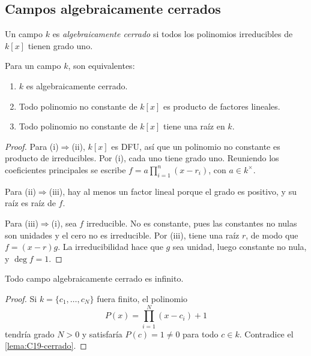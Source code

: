 \subsection{Campos algebraicamente cerrados}
\begin{defi}
Un campo $k$ es \emph{algebraicamente cerrado} si todos los polinomios irreducibles de $k[x]$ tienen grado uno.
\end{defi}
\begin{lema}\label{lema:C19-cerrado}
Para un campo $k$, son equivalentes:
\begin{enumerate}[label=\textup{(\roman*)}]
\item $k$ es algebraicamente cerrado.
\item Todo polinomio no constante de $k[x]$ es producto de factores lineales.
\item Todo polinomio no constante de $k[x]$ tiene una raíz en $k$.
\end{enumerate}
\end{lema}
\begin{proof}
Para (i)$\Rightarrow$(ii), $k[x]$ es DFU, así que un polinomio no constante es producto de irreducibles. Por (i), cada uno tiene grado uno. Reuniendo los coeficientes principales se escribe $f=a\prod_{i=1}^n(x-r_i)$, con $a\in k^\times$.

Para (ii)$\Rightarrow$(iii), hay al menos un factor lineal porque el grado es positivo, y su raíz es raíz de $f$.

Para (iii)$\Rightarrow$(i), sea $f$ irreducible. No es constante, pues las constantes no nulas son unidades y el cero no es irreducible. Por (iii), tiene una raíz $r$, de modo que $f=(x-r)g$. La irreducibilidad hace que $g$ sea unidad, luego constante no nula, y $\deg f=1$.
\end{proof}

\begin{prop}\label{prop:C19-infinito}
Todo campo algebraicamente cerrado es infinito.
\end{prop}
\begin{proof}
Si $k=\{c_1,\ldots,c_N\}$ fuera finito, el polinomio
\[
P(x)=\prod_{i=1}^N(x-c_i)+1
\]
tendría grado $N>0$ y satisfaría $P(c)=1\ne0$ para todo $c\in k$. Contradice el \cref{lema:C19-cerrado}.
\end{proof}

